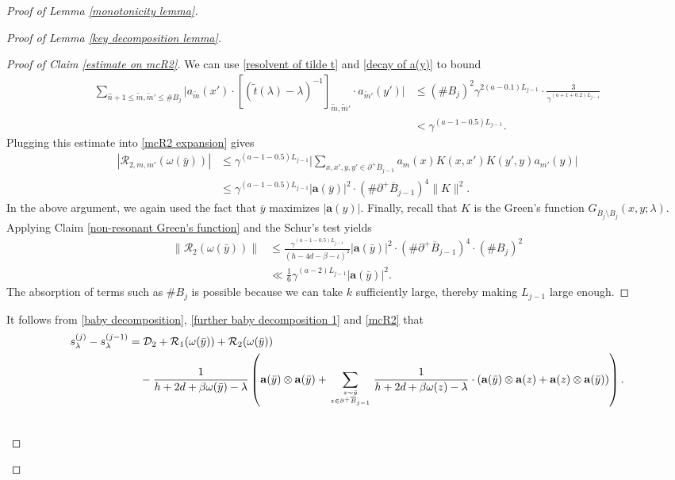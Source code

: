 \documentclass[11pt,reqno,UTF8,twoside]{amsart}
\renewcommand{\tt}{\tilde{t}}
\newcommand{\tm}{\widetilde{m}}
\newcommand{\bfa}{\mathbf{a}}
\newcommand{\mcD}{\mathcal{D}}
\newcommand{\mcR}{\mathcal{R}}
\newcommand{\whn}{\widehat{n}}
\newcommand{\barB}{\overline{B}}
\newcommand{\smallSj}{s^{(j)}}
\newcommand{\smallSjminusone}{s^{(j-1)}}
\theoremstyle{definition}
\numberwithin{equation}{section}
\begin{document}
\begin{proof}[Proof of Lemma \ref{monotonicity lemma}]
\begin{proof}[Proof of Lemma \ref{key decomposition lemma}]
\begin{proof}[Proof of Claim \ref{estimate on mcR2}]
  We can use \eqref{resolvent of tilde t} and \eqref{decay of a(y)} to bound 
  \begin{align*}
    \sum_{ \whn+1\leq \tm,\tm'\leq  \# B_j }  \bigg|a_{\tm}(x')\cdot [(\tt(\lambda)-\lambda)^{-1}]_{\tm,\tm'}\cdot a_{\tm'}(y')\bigg|& \leq  (\# B_j)^2 \gamma^{2(a-0.1)L_{j-1}} \cdot \frac{3}{\gamma^{(a+1+0.2)L_{j-1}}} \\
      &< \gamma^{(a-1-0.5)L_{j-1}}.
  \end{align*}
  Plugging this estimate into \eqref{mcR2 expansion} gives  
  \begin{align*}
    |\mcR_{2,m,m'}(\omega(\bar{y}))| &\leq\gamma^{(a-1-0.5)L_{j-1}} \bigg| \sum_{x,x',y,y'\in \partial^+\barB_{j-1}} a_{m}(x)K(x,x')  K(y',y) a_{m'}(y) \bigg| \\
    &\leq \gamma^{(a-1-0.5)L_{j-1}} |\bfa(\bar{y})|^2 \cdot (\# \partial^+\barB_{j-1})^4 \|K\|^2.
  \end{align*}
  In the above argument,  we again used the fact that $\bar{y}$ maximizes $|\bfa(y)|$. Finally, recall that $K$ is the Green's function $G_{\barB_{j}\setminus B_j}(x,y;\lambda)$. Applying Claim \ref{non-resonant Green's function} and the Schur's test yields
  \begin{align*}
    \|\mcR_{2}(\omega(\bar{y}))\| & \leq \frac{\gamma^{(a-1-0.5)L_{j-1}} }{(h-4d-\beta-\iota)^2}|\bfa(\bar{y})|^2 \cdot (\# \partial^+\barB_{j-1})^4 \cdot (\# B_{j})^2 \\
       &\ll \frac{1}{6}\gamma^{(a-2)L_{j-1}} |\bfa(\bar{y})|^2.
  \end{align*}
The absorption of terms such as $\# B_{j}$ is possible because we can take $k$ sufficiently large, thereby making $L_{j-1}$ large enough.
\end{proof}


It follows from \eqref{baby decomposition}, \eqref{further baby decomposition 1} and \eqref{mcR2} that
{\small
\begin{align}\label{second term decomposition}
  \smallSj_{\lambda}-\smallSjminusone_\lambda &= \mcD_2 +\mcR_1 (\omega(\bar{y})) +\mcR_2(\omega(\bar{y})) \\
  \notag &\ \ \ -\frac{1}{h+2d+\beta \omega(\bar{y})-\lambda}\left(\bfa(\bar{y})\otimes \bfa(\bar{y})+ \sum_{z\sim \bar{y} \atop z\in \partial^+\barB_{j-1}} \frac{1}{h+2d+\beta\omega(z)-\lambda } \cdot(\bfa(\bar{y}) \otimes  \bfa(z)+\bfa(z)\otimes\bfa(\bar{y})  )\right).
\end{align}
}


\noindent {\Large  {\textbf{(Term $(\smallSj_E-\smallSj_{\lambda})$)}}  }\\


\end{proof}
\end{proof}
\end{document}
